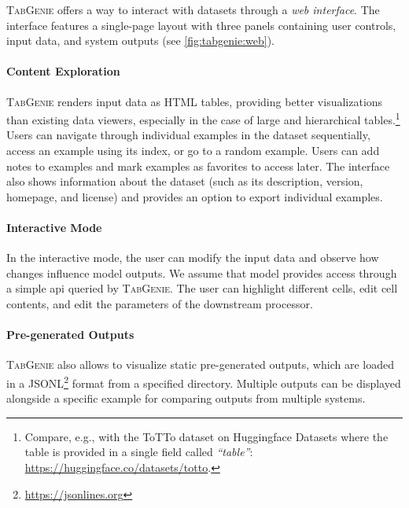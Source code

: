 \textsc{TabGenie} offers a way to interact with datasets through a \textit{web interface}. The interface features a single-page layout with three panels containing user controls, input data, and system outputs (see \autoref{fig:tabgenie:web}).

\paragraph{Content Exploration} \textsc{TabGenie} renders input data as HTML tables, providing better visualizations than existing data viewers, especially in the case of large and hierarchical tables.\footnote{Compare, e.g., with the ToTTo dataset on Huggingface Datasets where the table is provided in a single field called \textit{``table''}: \url{https://huggingface.co/datasets/totto}.} Users can navigate through individual examples in the dataset sequentially, access an example using its index, or go to a random example. Users can add notes to examples and mark examples as favorites to access later. The interface also shows information about the dataset (such as its description, version, homepage, and license) and provides an option to export individual examples.

\paragraph{Interactive Mode} In the interactive mode, the user can modify the input data and observe how changes influence model outputs. We assume that model provides access through a simple \acs{api} queried by \textsc{TabGenie}. The user can highlight different cells, edit cell contents, and edit the parameters of the downstream processor.



\paragraph{Pre-generated Outputs} \textsc{TabGenie} also allows to visualize static pre-generated outputs, which are loaded in a JSONL\footnote{\url{https://jsonlines.org}} format from a specified directory. Multiple outputs can be displayed alongside a specific example for comparing outputs from multiple systems.



